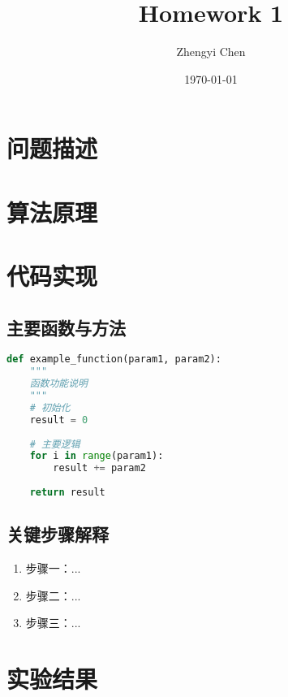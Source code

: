 \documentclass[letterpaper,12pt]{article}
\title{Homework 1}
\author{Zhengyi Chen}
\date{\today}
\begin{document}
\maketitle

\begin{abstract}
\end{abstract}

\section{问题描述}

\section{算法原理}

\section{代码实现}

\subsection{主要函数与方法}
\begin{lstlisting}[language=Python, caption=示例代码]
def example_function(param1, param2):
    """
    函数功能说明
    """
    # 初始化
    result = 0
    
    # 主要逻辑
    for i in range(param1):
        result += param2
        
    return result
\end{lstlisting}

\subsection{关键步骤解释}
\begin{enumerate}[label=\arabic*., leftmargin=*]
    \item 步骤一：...
    \item 步骤二：...
    \item 步骤三：...
\end{enumerate}

\section{实验结果}
\end{document}
